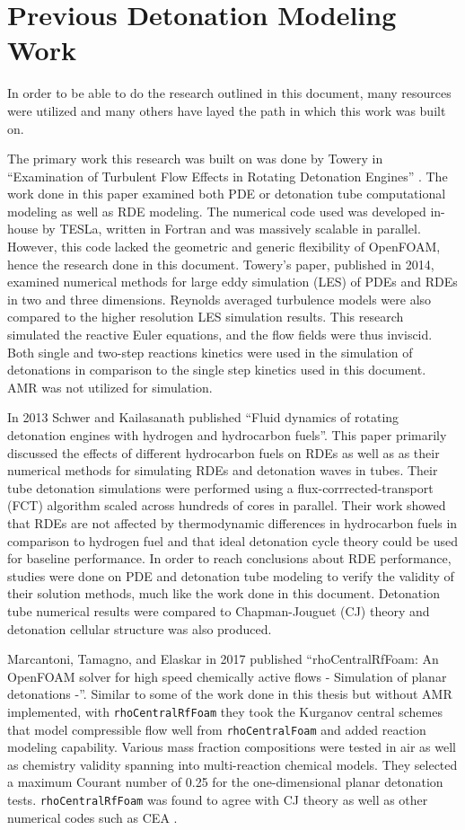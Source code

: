 \section{Previous Detonation Modeling Work}
In order to be able to do the research outlined in this document, many resources were utilized and many others have layed the path in which this work was built on. 

The primary work this research was built on was done by Towery in ``Examination of Turbulent Flow Effects in Rotating Detonation Engines'' \cite{towery1}. The work done in this paper examined both PDE or detonation tube computational modeling as well as RDE modeling. The numerical code used was developed in-house by TESLa, written in Fortran and was massively scalable in parallel. However, this code lacked the geometric and generic flexibility of OpenFOAM, hence the research done in this document. Towery's paper, published in 2014, examined numerical methods for large eddy simulation (LES) of PDEs and RDEs in two and three dimensions. Reynolds averaged turbulence models were also compared to the higher resolution LES simulation results. This research simulated the reactive Euler equations, and the flow fields were thus inviscid. Both single and two-step reactions kinetics were used in the simulation of detonations in comparison to the single step kinetics used in this document. AMR was not utilized for simulation. 

In 2013 Schwer and Kailasanath published ``Fluid dynamics of rotating detonation engines with hydrogen and hydrocarbon fuels''\cite{schwer1}. This paper primarily discussed the effects of different hydrocarbon fuels on RDEs as well as as their numerical methods for simulating RDEs and detonation waves in tubes. Their tube detonation simulations were performed using a flux-corrrected-transport (FCT) algorithm scaled across hundreds of cores in parallel. Their work showed that RDEs are not affected by thermodynamic differences in hydrocarbon fuels in comparison to hydrogen fuel and that ideal detonation cycle theory could be used for baseline performance. In order to reach conclusions about RDE performance, studies were done on PDE and detonation tube modeling to verify the validity of their solution methods, much like the work done in this document. Detonation tube numerical results were compared to Chapman\cite{chapman}-Jouguet\cite{jouguet} (CJ) theory  and detonation cellular structure was also produced. 

Marcantoni, Tamagno, and Elaskar in 2017 published ``rhoCentralRfFoam: An OpenFOAM solver for high speed chemically active flows - Simulation of planar detonations -''\cite{marcantoni}. Similar to some of the work done in this thesis but without AMR implemented, with \verb|rhoCentralRfFoam| they took the Kurganov central schemes that model compressible flow well from \verb|rhoCentralFoam| and added reaction modeling capability. Various mass fraction compositions were tested in air as well as chemistry validity spanning into multi-reaction chemical models. They selected a maximum Courant number of 0.25 for the one-dimensional planar detonation tests. \verb|rhoCentralRfFoam| was found to agree with CJ theory as well as other numerical codes such as CEA \cite{CEA}. 

